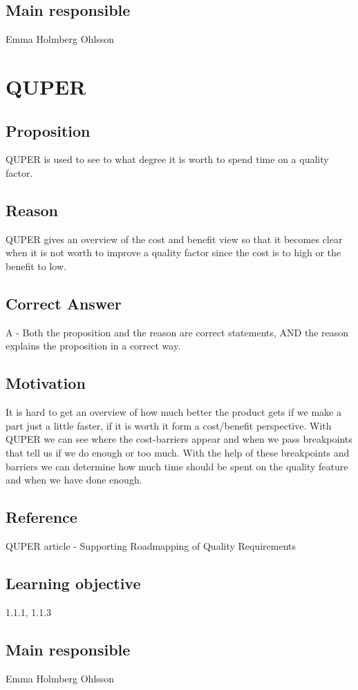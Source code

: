 \documentclass[a4paper]{article}
\begin{document}
\subsection*{Main responsible}
Emma Holmberg Ohlsson

\section{QUPER}
\subsection*{Proposition}
QUPER is used to see to what degree it is worth to spend time on a quality factor.
\subsection*{Reason}
QUPER gives an overview of the cost and benefit view so that it becomes clear when it is not worth to improve a quality factor since the cost is to high or the benefit to low.
\subsection*{Correct Answer}
A - Both the proposition and the reason are correct statements,
AND the reason explains the proposition in a correct way. 
\subsection*{Motivation}
It is hard to get an overview of how much better the product gets if we make a part just a little faster, if it is worth it form a cost/benefit perspective. With QUPER we can see where the cost-barriers appear and when we pass breakpoints that tell us if we do enough or too much. With the help of these breakpoints and barriers we can determine how much time should be spent on the quality feature and when we have done enough.
\subsection*{Reference}
QUPER article - Supporting Roadmapping of Quality Requirements
\subsection*{Learning objective}
1.1.1, 1.1.3
\subsection*{Main responsible}
Emma Holmberg Ohlsson
\end{document}
